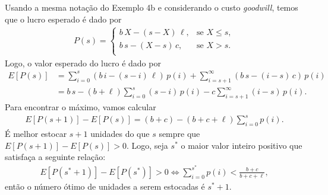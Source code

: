 
\begin{questions}

\setcounter{question}{33}
\begin{solution}
	Usando a mesma notação do Exemplo 4b e considerando o custo \textit{goodwill}, temos que o lucro esperado é dado por
    \begin{align*}
    	P(s) = \begin{cases}
    		b\,X-(s-X)\,\ell, &\text{se } X \le s,\\
            b\,s-(X-s)\,c, &\text{se } X > s.\\
    	\end{cases}
    \end{align*}
    Logo, o valor esperado do lucro é dado por
    \begin{align*}
    	E[P(s)] 
        	&= \sum_{i=0}^s (b\,i-(s-i)\,\ell)\,p(i)
            	+ \sum_{i=s+1}^\infty  (b\,s-(i-s)\,c)\,p(i)\\
            &= b\,s - (b+\ell) \sum_{i=0}^s (s-i)\,p(i)
            	- c\sum_{i=s+1}^\infty (i-s)\,p(i).
    \end{align*}
    Para encontrar o máximo, vamos calcular
    \begin{align*}
    	E[P(s+1)]-E[P(s)] = (b+c) - (b+c+\ell)\sum_{i=0}^s p(i).
    \end{align*}
    É melhor estocar $s+1$ unidades do que $s$ sempre que ${E[P(s+1)]-E[P(s)]>0}$. Logo, seja $s^*$ o maior valor inteiro positivo que satisfaça a seguinte relação:
    \begin{align*}
    	E[P(s^*+1)]-E[P(s^*)] > 0
        	\Leftrightarrow \sum_{i=0}^{s^*} p(i) < \frac{b+c}{b+c+\ell},
    \end{align*}
    então o número ótimo de unidades a serem estocadas é $s^*+1$.    
\end{solution}

\end{questions}
